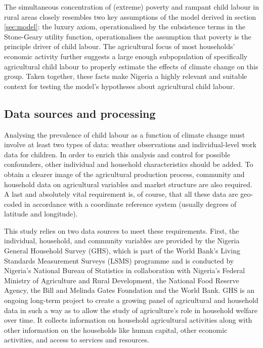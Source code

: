 \documentclass[a4paper,12pt]{article}
\theoremstyle{plain}
\theoremstyle{definition}
\theoremstyle{definition}
\theoremstyle{definition}
\theoremstyle{definition}
\begin{document}
The simultaneous concentration of (extreme) poverty and rampant child labour in rural areas closely resembles two key assumptions of the model derived in section \ref{sec:model}: the luxury axiom, operationalised by the subsistence terms in the Stone-Geary utility function, operationalises the assumption that poverty is the principle driver of child labour. The agricultural focus of most households' economic activity further suggests a large enough subpopulation of specifically agricultural child labour to properly estimate the effects of climate change on this group. Taken together, these facts make Nigeria a highly relevant and suitable context for testing the model's hypotheses about agricultural child labour.

\subsection{Data sources and processing}
\label{sub:data_sources}
Analysing the prevalence of child labour as a function of climate change must involve at least two types of data: weather observations and individual-level work data for children. In order to enrich this analysis and control for possible confounders, other individual and household characteristics should be added. To obtain a clearer image of the agricultural production process, community and household data on agricultural variables and market structure are also required. A last and absolutely vital requirement is, of course, that all these data are geo-coded in accordance with a coordinate reference system (usually degrees of latitude and longitude).

This study relies on two data sources to meet these requirements. First, the individual, household, and community variables are provided by the Nigeria General Household Survey (GHS), which is part of the World Bank's Living Standards Measurement Surveys (LSMS) programme and is conducted by Nigeria's National Bureau of Statistics in collaboration with Nigeria's Federal Ministry of Agriculture and Rural Development, the National Food Reserve Agency, the Bill and Melinda Gates Foundation and the World Bank. GHS is an ongoing long-term project to create a growing panel of agricultural and household data in such a way as to allow the study of agriculture’s role in household welfare over time. It collects information on household agricultural activities along with other information on the households like human capital, other economic activities, and access to services and resources.
\end{document}
